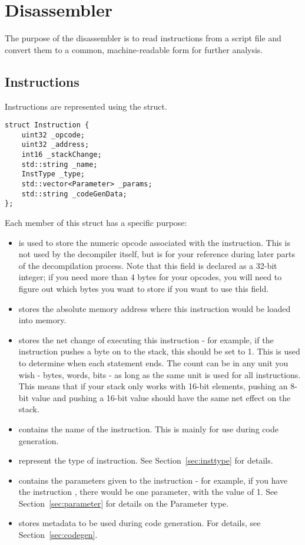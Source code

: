 \section{Disassembler}
\label{sec:disassembler}
The purpose of the disassembler is to read instructions from a script file and convert them to a common, machine-readable form for further analysis.

\subsection{Instructions}
Instructions are represented using the  struct.

\begin{C++}
\begin{lstlisting}
struct Instruction {
	uint32 _opcode;
	uint32 _address;
	int16 _stackChange;
	std::string _name;
	InstType _type;
	std::vector<Parameter> _params;
	std::string _codeGenData;
};
\end{lstlisting}
\end{C++}

Each member of this struct has a specific purpose:
\begin{itemize}
\item {} is used to store the numeric opcode associated with the instruction. This is not used by the decompiler itself, but is for your reference during later parts of the decompilation process. Note that this field is declared as a 32-bit integer; if you need more than 4 bytes for your opcodes, you will need to figure out which bytes you want to store if you want to use this field.
\item {} stores the absolute memory address where this instruction would be loaded into memory.
\item {} stores the net change of executing this instruction - for example, if the instruction pushes a byte on to the stack, this should be set to 1. This is used to determine when each statement ends. The count can be in any unit you wish - bytes, words, bits - as long as the same unit is used for all instructions. This means that if your stack only works with 16-bit elements, pushing an 8-bit value and pushing a 16-bit value should have the same net effect on the stack.
\item {} contains the name of the instruction. This is mainly for use during code generation.
\item {} represent the type of instruction. See Section~\vref{sec:insttype} for details.
\item {} contains the parameters given to the instruction - for example, if you have the instruction , there would be one parameter, with the value of 1. See Section~\vref{sec:parameter} for details on the Parameter type.
\item {} stores metadata to be used during code generation. For details, see Section~\vref{sec:codegen}.
\end{itemize}

